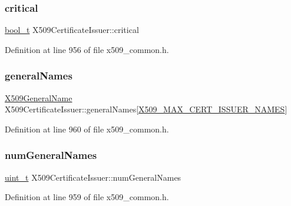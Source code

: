 \subsubsection{\texorpdfstring{critical}{critical}}
{\footnotesize\ttfamily \hyperlink{compiler__port_8h_a812d16e5494522586b3784e55d479912}{bool\+\_\+t} X509\+Certificate\+Issuer\+::critical}



Definition at line 956 of file x509\+\_\+common.\+h.

\mbox{\label{structX509CertificateIssuer_a5d622673ff3debbb98c1ab08a79951e8}} 
\subsubsection{\texorpdfstring{general\+Names}{generalNames}}
{\footnotesize\ttfamily \hyperlink{structX509GeneralName}{X509\+General\+Name} X509\+Certificate\+Issuer\+::general\+Names\mbox{[}\hyperlink{pkix_2x509__common_8h_a09e385209ce2093edad815e2a702f2c4}{X509\+\_\+\+M\+A\+X\+\_\+\+C\+E\+R\+T\+\_\+\+I\+S\+S\+U\+E\+R\+\_\+\+N\+A\+M\+ES}\mbox{]}}



Definition at line 960 of file x509\+\_\+common.\+h.

\mbox{\label{structX509CertificateIssuer_aaa36ed84755aba7fc15aed1d88d6660c}} 
\subsubsection{\texorpdfstring{num\+General\+Names}{numGeneralNames}}
{\footnotesize\ttfamily \hyperlink{compiler__port_8h_a12a1e9b3ce141648783a82445d02b58d}{uint\+\_\+t} X509\+Certificate\+Issuer\+::num\+General\+Names}



Definition at line 959 of file x509\+\_\+common.\+h.

\mbox{\label{structX509CertificateIssuer_aca740e49878dfee5262e84711add3685}} 
